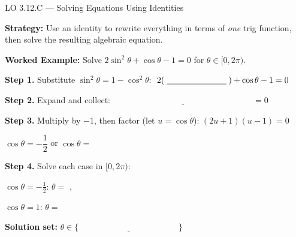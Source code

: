 \documentclass[10pt]{article}
\begin{document}
\begin{notesbox}{LO 3.12.C --- Solving Equations Using Identities}

\textbf{Strategy:} Use an identity to rewrite everything in terms of \emph{one}
trig function, then solve the resulting algebraic equation.

\vspace{6pt}
\textbf{Worked Example:} Solve $2\sin^2\theta + \cos\theta - 1 = 0$ for $\theta \in [0, 2\pi)$.

\vspace{4pt}
\textbf{Step 1.} Substitute $\sin^2\theta = 1 - \cos^2\theta$:
$\;2(\;\underline{\hspace{2.5cm}}\;) + \cos\theta - 1 = 0$

\vspace{4pt}
\textbf{Step 2.} Expand and collect:
$\underline{\hspace{7cm}} = 0$

\vspace{4pt}
\textbf{Step 3.} Multiply by $-1$, then factor (let $u = \cos\theta$):
$(2u + 1)(u - 1) = 0$

\vspace{4pt}
$\cos\theta = -\dfrac{1}{2}$ \quad or \quad $\cos\theta = $ \underline{\hspace{1.2cm}}

\vspace{4pt}
\textbf{Step 4.} Solve each case in $[0, 2\pi)$:

\vspace{2pt}
$\cos\theta = -\tfrac{1}{2}$: \quad $\theta = $ \underline{\hspace{1.5cm}}, \underline{\hspace{1.5cm}}

\vspace{4pt}
$\cos\theta = 1$: \quad $\theta = $ \underline{\hspace{1.5cm}}

\vspace{6pt}
\textbf{Solution set:} $\theta \in \big\{ \underline{\hspace{5cm}} \big\}$

\end{notesbox}

\vspace{0.08in}
\end{document}
